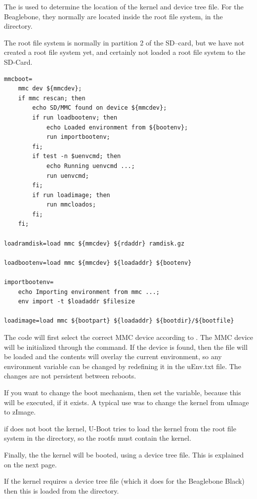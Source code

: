 The  is used to determine the location of the kernel and device tree file.
For the Beaglebone, they normally are located inside the root file system, in the  directory.

The root file system is normally in partition 2 of the SD--card, but we have not created
a root file system yet, and certainly not loaded a root file system to the SD-Card.

\begin{lstlisting}
mmcboot=
	mmc dev ${mmcdev};
	if mmc rescan; then
		echo SD/MMC found on device ${mmcdev};
		if run loadbootenv; then
			echo Loaded environment from ${bootenv};
			run importbootenv;
		fi;
		if test -n $uenvcmd; then 
			echo Running uenvcmd ...;
			run uenvcmd;
		fi;
		if run loadimage; then
			run mmcloados;
		fi;
	fi;

loadramdisk=load mmc ${mmcdev} ${rdaddr} ramdisk.gz

loadbootenv=load mmc ${mmcdev} ${loadaddr} ${bootenv}

importbootenv=
	echo Importing environment from mmc ...; 
	env import -t $loadaddr $filesize

loadimage=load mmc ${bootpart} ${loadaddr} ${bootdir}/${bootfile}
\end{lstlisting}

The  code will first select the correct MMC device according to .
The MMC device will be initialized through the  command.
If the device is found, then the file  will be loaded and the contents
will overlay the current environment, so any environment variable can be 
changed by redefining it in the uEnv.txt file. The changes are not persistent between reboots.

If you want to change the boot mechanism, then set the  variable,
because this will be executed, if it exists.
A typical use was to change the kernel from uImage to zImage.

if  does not boot the kernel, U-Boot tries to load the kernel from the root file system
in the  directory, so the rootfs must contain the kernel.

Finally, the the kernel will be booted, using a device tree file.
This is explained on the next page.

\clearpage

If the kernel requires a device tree file (which it does for the Beaglebone Black)
then this is loaded from the  directory.

